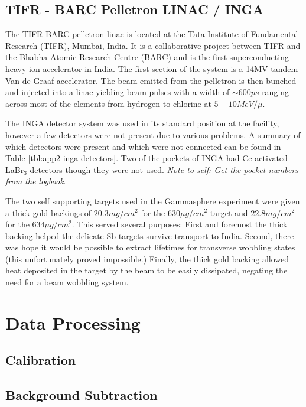 \subsection{TIFR - BARC Pelletron LINAC / INGA}
\label{ssec:exp-pr-details-inga}
The TIFR-BARC pelletron linac is located at the Tata Institute of Fundamental Research (TIFR), Mumbai, India. It is a collaborative project between TIFR and the Bhabha Atomic Research Centre (BARC) and is the first superconducting heavy ion accelerator in India. The first section of the system is a 14MV tandem Van de Graaf accelerator. The beam emitted from the pelletron is then bunched and injected into a linac yielding beam pulses with a width of $\sim{}600ps$ ranging across most of the elements from hydrogen to chlorine at $5-10MeV/\mu{}$.

The INGA detector system was used in its standard position at the facility, however a few detectors were not present due to various problems. A summary of which detectors were present and which were not connected can be found in Table \ref{tbl:app2-inga-detectors}. Two of the pockets of INGA had Ce activated LaBr$_3$ detectors though they were not used. \emph{Note to self: Get the pocket numbers from the logbook}.

The two self supporting targets used in the Gammasphere experiment were given a thick gold backings of $20.3mg/cm^2$ for the $630\mu{}g/cm^2$ target and $22.8mg/cm^2$ for the $634\mu{}g/cm^2$\cite{sbTargets}. This served several purposes: First and foremost the thick backing helped the delicate Sb targets survive transport to India. Second, there was hope it would be possible to extract lifetimes for transverse wobbling states (this unfortunately proved impossible.) Finally, the thick gold backing allowed heat deposited in the target by the beam to be easily dissipated, negating the need for a beam wobbling system.

\section{Data Processing}
\label{sec:exp-pr-data-proc}
\subsection{Calibration}
\label{ssec:exp-pr-data-proc-cal}
\subsection{Background Subtraction}
\label{ssec:exp-pr-data-proc-bg-sub}
